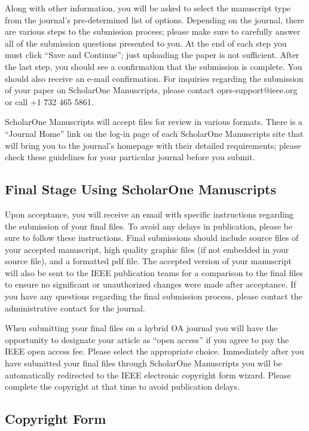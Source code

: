 \documentclass[correspondence]{IEEEtaes}
\begin{document}
Along with other information, you will be asked to select the manuscript type from the journal's pre-determined list of options. Depending on the journal, there are various steps to the submission process; please make sure to carefully answer all of the submission questions presented to you. At the end of each step you must click ``Save and Continue''; just uploading the paper is not sufficient. After the last step, you should see a confirmation that the submission is complete. You should also receive an e-mail confirmation. For inquiries regarding the submission of your paper on ScholarOne Manuscripts, please contact oprs-support@ieee.org or call +1 732 465 5861.

ScholarOne Manuscripts will accept files for review in various formats. There is a ``Journal Home'' link on the log-in page of each ScholarOne Manuscripts site that will bring you to the journal's homepage with their detailed requirements; please check these guidelines for your particular journal before you submit.

\subsection{Final Stage Using ScholarOne Manuscripts}

Upon acceptance, you will receive an email with specific instructions regarding the submission of your final files. To avoid any delays in publication, please be sure to follow these instructions. Final submissions should include source files of your accepted manuscript, high quality graphic files (if not embedded in your source file), and a formatted pdf file. The accepted version of your manuscript will also be sent to the IEEE publication teams for a comparison to the final files to ensure no significant or unauthorized changes were made after acceptance. If you have any questions regarding the final submission process, please contact the administrative contact for the journal.

When submitting your final files on a hybrid OA journal you will have the opportunity to designate your article as ``open access'' if you agree to pay the IEEE open access fee. Please select the appropriate choice. Immediately after you have submitted your final files through ScholarOne Manuscripts you will be automatically redirected to the IEEE electronic copyright form wizard. Please complete the copyright at that time to avoid publication delays.

\subsection{Copyright Form}
\end{document}
